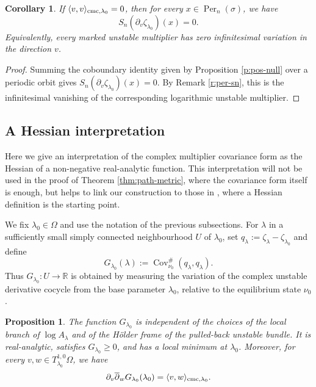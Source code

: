 \documentclass[11pt]{amsart}
\theoremstyle{plain}
\newtheorem{cor}[thm]{Corollary}
\newtheorem{prop}[thm]{Proposition}
\theoremstyle{definition}
\theoremstyle{remark}
\begin{document}
\begin{cor}\label{c:per}
If $\langle v,v\rangle_{{\rm cmc},\lambda_0}=0$, then
for every $x\in\operatorname{Per}_n(\sigma)$, we have
$$
S_n(\partial_v\zeta_{\lambda_0})(x)=0.
$$
Equivalently, every marked unstable multiplier has zero infinitesimal
variation in the direction $v$.
\end{cor}

\begin{proof}
Summing the
coboundary identity
given by Proposition \ref{p:pos-null}
over a periodic orbit gives
$S_n(\partial_v\zeta_{\lambda_0})(x)=0$. 
By Remark \ref{r:per-sn}, 
this is the infinitesimal vanishing of the corresponding
logarithmic unstable multiplier.
\end{proof}


\subsection{A Hessian interpretation}
Here we give an  interpretation of the complex multiplier covariance
form as the Hessian of a non-negative real-analytic function. This
interpretation will not be used in the proof of Theorem \ref{thm:path-metric},
where the covariance form itself is
enough, but helps to link
our construction to those in \cite{HeNie23,BH24,BH25}, 
where a Hessian definition is the starting point.

We fix $\lambda_0\in\Omega$ and use the notation of the previous
subsections. For $\lambda$ in a sufficiently small simply connected
neighbourhood $U$ of $\lambda_0$, set
$q_\lambda:=\zeta_\lambda-\zeta_{\lambda_0}$ and
define
$$
G_{\lambda_0}(\lambda) :=
\operatorname{Cov}^{\#}_{\nu_0} (q_\lambda,q_\lambda).
$$
Thus $G_{\lambda_0}\colon U\to\mathbb R$ is obtained by measuring the variation of the
complex unstable derivative cocycle from the base parameter
$\lambda_0$, relative to the equilibrium state
$\nu_0$.

\begin{prop}
The function $G_{\lambda_0}$ is independent of the choices of the
local branch of $\log A_\lambda$ and of the Hölder frame of the
pulled-back unstable bundle. It is real-analytic, satisfies
$G_{\lambda_0}\geq 0$, and has a local minimum at $\lambda_0$.
Moreover, for every
$v,w\in T^{1,0}_{\lambda_0}\Omega$, we have
$$
\partial_v\overline{\partial}_w G_{\lambda_0}(\lambda_0)
  =
\langle v,w\rangle_{{\rm cmc},\lambda_0}.
$$
\end{prop}
\end{document}
